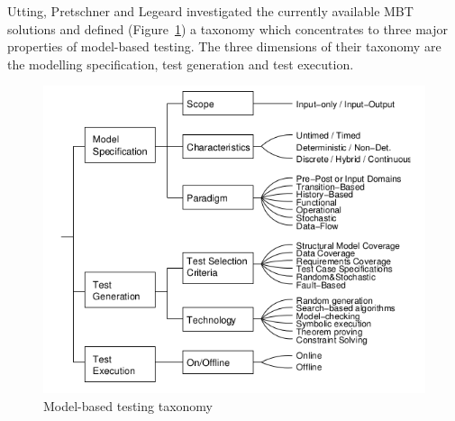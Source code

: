 Utting, Pretschner and Legeard investigated the currently available MBT solutions and defined (Figure~\ref{fig:mbttaxonomy}) a taxonomy which concentrates to three major properties of model-based testing. The three dimensions of their taxonomy are the modelling specification, test generation and test execution.

\begin{figure}[htp]
\centering
\includegraphics[scale=0.5]{figures/mbt_taxonomy.png}
\caption{Model-based testing taxonomy \cite{taxonomy}}
\label{fig:mbttaxonomy}
\end{figure}

